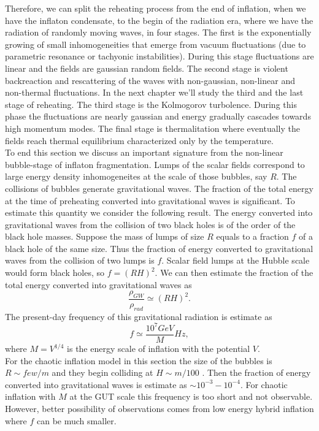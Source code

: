 \documentclass[11pt,a4paper,twoside]{book}
\begin{document}
Therefore, we can split the reheating process from the end of inflation, when we have the inflaton condensate, to the begin of the radiation era, where we have the radiation of randomly moving waves, in four stages. The first is the exponentially growing of small inhomogeneities that emerge from vacuum fluctuations (due to parametric resonance or tachyonic instabilities). During this stage fluctuations are linear and the fields are gaussian random fields. The second stage is violent backreaction and rescattering of the waves with non-gaussian, non-linear and non-thermal fluctuations. In the next chapter we'll study the third and the last stage of reheating. The third stage is the Kolmogorov turbolence. During this phase the fluctuations are nearly gaussian and energy gradually cascades towards high momentum modes. The final stage is thermalitation where eventually the fields reach thermal equilibrium characterized only by the temperature.\\
To end this section we discuss an important signature from the non-linear bubble-stage of inflaton fragmentation. Lumps of the scalar fields correspond to large energy density inhomogeneites at the scale of those bubbles, say $ R $. The collisions of bubbles generate gravitational waves. The fraction of the total energy at the time of preheating converted into gravitational waves is significant. To estimate this quantity we consider the following result. The energy converted into gravitational waves from the collision of two black holes is of the order of the black hole masses. Suppose the mass of lumps of size $ R $ equals to a fraction $ f $ of a black hole of the same size.
Thus the fraction of energy converted to gravitational waves from the collision of two lumps is $ f $. Scalar field lumps at the Hubble scale would form black holes, so $ f = (RH)^{2} $. We can then estimate the fraction of the total energy  converted into gravitational waves as
\begin{equation}
\label{Chap5:fractionTotalEnergyGW}
\frac{\rho_{GW}}{\rho_{rad}} \simeq (RH)^{2}.
\end{equation}
The present-day frequency of this gravitational radiation is  estimate as 
\begin{equation}
\label{Chap5:frequencyGW}
f\simeq \frac{10^{7} GeV}{M} Hz,
\end{equation}
where $ M=V^{1/4} $ is the energy scale of inflation with the potential $ V $.\\
For the chaotic inflation model in this section the size of the bubbles is $ R\sim few/m $ and they begin colliding at $ H\sim m/100 $ \cite{Chap5:Fragmentation}. Then the fraction of energy converted into gravitational waves is estimate as $\sim 10^{-3}-10^{-4}$. For chaotic inflation with $ M  $ at the GUT scale this frequency is too short and not observable. However, better possibility of observations comes from low energy hybrid inflation where $ f $ can be much smaller. \\
\end{document}
